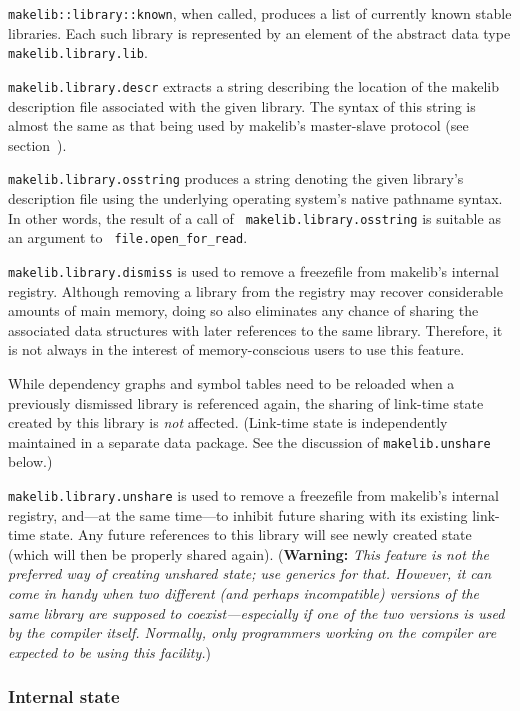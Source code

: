 {\tt makelib::library::known}, when called, produces a list of currently
known stable libraries.  Each such library is represented by an
element of the abstract data type {\tt makelib.library.lib}.

{\tt makelib.library.descr} extracts a string describing the location of
the makelib description file associated with the given library.  The syntax
of this string is almost the same as that being used by makelib's
master-slave protocol (see section~).

{\tt makelib.library.osstring} produces a string denoting the given
library's description file using the underlying operating system's
native pathname syntax.  In other words, the result of a call of {\tt
makelib.library.osstring} is suitable as an argument to {\tt
file.open_for_read}.

{\tt makelib.library.dismiss} is used to remove a freezefile from makelib's
internal registry.  Although removing a library from the registry may
recover considerable amounts of main memory, doing so also eliminates
any chance of sharing the associated data structures with later
references to the same library.  Therefore, it is not always in the
interest of memory-conscious users to use this feature.

While dependency graphs and symbol tables need to be reloaded when a
previously dismissed library is referenced again, the sharing of
link-time state created by this library is {\em not} affected.
(Link-time state is independently maintained in a separate data
package.  See the discussion of {\tt makelib.unshare} below.)

{\tt makelib.library.unshare} is used to remove a freezefile from makelib's
internal registry, and---at the same time---to inhibit future sharing
with its existing link-time state.  Any future references to this
library will see newly created state (which will then be properly
shared again).  ({\bf Warning:} {\it This feature is not the preferred
way of creating unshared state; use generics for that.  However, it
can come in handy when two different (and perhaps incompatible)
versions of the same library are supposed to coexist---especially if
one of the two versions is used by the compiler itself.  Normally, only
programmers working on the compiler are expected to be using this
facility.})

\subsubsection{Internal state}

